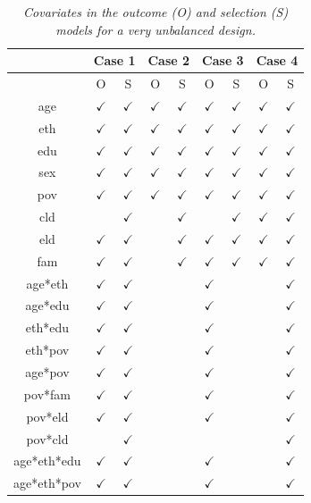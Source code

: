 \documentclass[11pt]{article}
\numberwithin{figure}{section}
\numberwithin{table}{section}
\numberwithin{equation}{section}
\begin{document}
\begin{table}
\begin{center}
\caption{\em Covariates in the outcome (O) and selection (S) models for a very unbalanced design.}
\label{s2-design}
\small
\begin{tabular}{c|cc|cc|cc|cc}
&\multicolumn{2}{|c|}{Case 1}&\multicolumn{2}{|c|}{Case 2}&\multicolumn{2}{|c|}{Case 3}&\multicolumn{2}{c}{Case 4}\\
\hline
&O&S&O&S&O&S&O&S\\
age&$\checkmark$&$\checkmark$&$\checkmark$&$\checkmark$&$\checkmark$&$\checkmark$&$\checkmark$&$\checkmark$\\
eth&$\checkmark$&$\checkmark$&$\checkmark$&$\checkmark$&$\checkmark$&$\checkmark$&$\checkmark$&$\checkmark$\\
edu&$\checkmark$&$\checkmark$&$\checkmark$&$\checkmark$&$\checkmark$&$\checkmark$&$\checkmark$&$\checkmark$\\
sex&$\checkmark$&$\checkmark$&$\checkmark$&$\checkmark$&$\checkmark$&$\checkmark$&$\checkmark$&$\checkmark$\\
pov&$\checkmark$&$\checkmark$&$\checkmark$&$\checkmark$&$\checkmark$&$\checkmark$&$\checkmark$&$\checkmark$\\
cld&&$\checkmark$&&$\checkmark$&&$\checkmark$&$\checkmark$&$\checkmark$\\
eld&$\checkmark$&$\checkmark$&&$\checkmark$&$\checkmark$&$\checkmark$&$\checkmark$&$\checkmark$\\
fam&$\checkmark$&$\checkmark$&&$\checkmark$&$\checkmark$&$\checkmark$&$\checkmark$&$\checkmark$\\
age*eth&$\checkmark$&$\checkmark$&&&$\checkmark$&&&$\checkmark$\\
age*edu&$\checkmark$&$\checkmark$&&&$\checkmark$&&&$\checkmark$\\
eth*edu&$\checkmark$&$\checkmark$&&&$\checkmark$&& &$\checkmark$\\
eth*pov&$\checkmark$&$\checkmark$&&&$\checkmark$&&&$\checkmark$\\
age*pov&$\checkmark$&$\checkmark$&&&$\checkmark$&&&$\checkmark$\\
pov*fam&$\checkmark$&$\checkmark$&&&$\checkmark$&&&$\checkmark$\\
pov*eld&$\checkmark$&$\checkmark$&&&$\checkmark$&&&$\checkmark$\\
pov*cld&&$\checkmark$&&&&&&$\checkmark$\\
age*eth*edu&$\checkmark$&$\checkmark$&&&$\checkmark$&&&$\checkmark$\\
age*eth*pov&$\checkmark$&$\checkmark$&&&$\checkmark$&&&$\checkmark$
\end{tabular}
\end{center}
\end{table}
\end{document}
